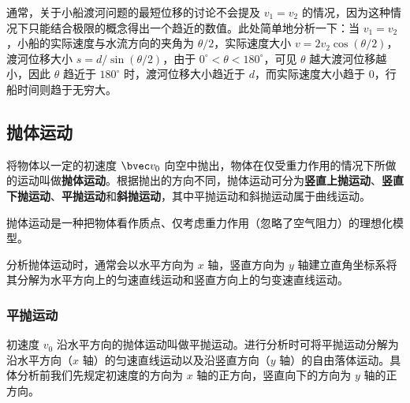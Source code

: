 通常，关于小船渡河问题的最短位移的讨论不会提及 $v_1=v_2$ 的情况，因为这种情况下只能结合极限的概念得出一个趋近的数值。此处简单地分析一下：当 $v_1=v_2$，小船的实际速度与水流方向的夹角为 $\theta /2$，实际速度大小 $v=2v_2\cos(\theta /2)$，渡河位移大小 $s= d/\sin(\theta/2)$，由于 $0^\circ < \theta < 180^\circ $，可见 $\theta$ 越大渡河位移越小，因此 $\theta$ 趋近于 $180^\circ $ 时，渡河位移大小趋近于 $d$，而实际速度大小趋于 $0$，行船时间则趋于无穷大。

\subsection{抛体运动}
将物体以一定的初速度 $\bvec v_0$ 向空中抛出，物体在仅受重力作用的情况下所做的运动叫做\textbf{抛体运动}。根据抛出的方向不同，抛体运动可分为\textbf{竖直上抛运动}、\textbf{竖直下抛运动}、\textbf{平抛运动}和\textbf{斜抛运动}，其中平抛运动和斜抛运动属于曲线运动。

抛体运动是一种把物体看作质点、仅考虑重力作用（忽略了空气阻力）的理想化模型。

分析抛体运动时，通常会以水平方向为 $x$ 轴，竖直方向为 $y$ 轴建立直角坐标系将其分解为水平方向上的匀速直线运动和竖直方向上的匀变速直线运动。

\subsubsection{平抛运动}
初速度 $v_0$ 沿水平方向的抛体运动叫做平抛运动。进行分析时可将平抛运动分解为沿水平方向（$x$ 轴）的匀速直线运动以及沿竖直方向（$y$ 轴）的自由落体运动。具体分析前我们先规定初速度的方向为 $x$ 轴的正方向，竖直向下的方向为 $y$ 轴的正方向。

